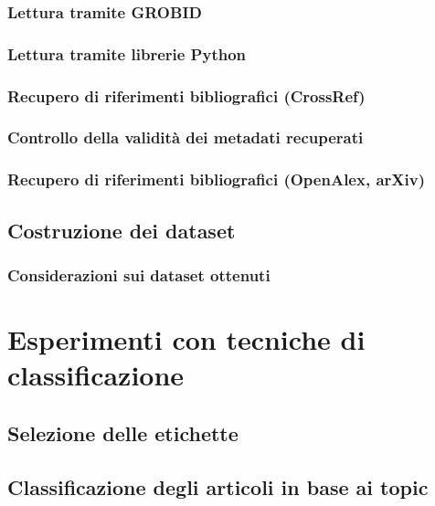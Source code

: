 \documentclass[12pt,a4paper,twoside]{book}
\begin{document}
\subsection{Lettura tramite GROBID}
\label{3.2.1}


\subsection{Lettura tramite librerie Python}


\subsection{Recupero di riferimenti bibliografici (CrossRef)}
\label{3.2.3}


\subsection{Controllo della validità dei metadati recuperati}
\label{3.2.4}


\subsection{Recupero di riferimenti bibliografici (OpenAlex, arXiv)}


\section{Costruzione dei dataset}


\subsection{Considerazioni sui dataset ottenuti}


\chapter{Esperimenti con tecniche di classificazione}
\label{4.0}


\section{Selezione delle etichette}
\label{4.1}


\section{Classificazione degli articoli in base ai topic}

\end{document}
